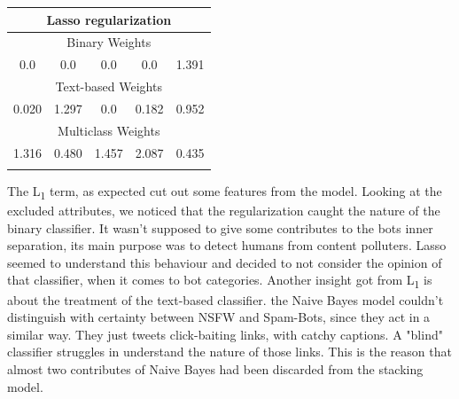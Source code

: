 \begin{center}
	\begin{tabular}{@{}ccccc@{}}
		\multicolumn{5}{c}{\textbf{Lasso regularization}}\\
		\hline\hline
		\multicolumn{5}{c}{Binary Weights}\\
		\hline
		\multicolumn{1}{c|}{0.0}&
		\multicolumn{1}{c|}{0.0}&
		\multicolumn{1}{c|}{0.0}&
		\multicolumn{1}{c|}{0.0}&
		\multicolumn{1}{c}{1.391}\\
		\hline
		\multicolumn{5}{c}{Text-based Weights}\\
		\hline
		\multicolumn{1}{c|}{0.020}&
		\multicolumn{1}{c|}{1.297}&
		\multicolumn{1}{c|}{0.0}&
		\multicolumn{1}{c|}{0.182}&
		\multicolumn{1}{c}{0.952}\\
		\hline
		\multicolumn{5}{c}{Multiclass Weights}\\
		\hline
		\multicolumn{1}{c|}{1.316}&
		\multicolumn{1}{c|}{0.480}&
		\multicolumn{1}{c|}{1.457}&
		\multicolumn{1}{c|}{2.087}&
		\multicolumn{1}{c}{0.435}\\
		\hline\hline\\
	\end{tabular}
\end{center}
The L\textsubscript{1} term, as expected cut out some features from the model.
Looking at the excluded attributes, we noticed that the regularization caught the nature of the binary classifier. It wasn't supposed to give some contributes to the bots inner separation, its main purpose was to detect humans from content polluters.
Lasso seemed to understand this behaviour and decided to not consider the opinion of that classifier, when it comes to bot categories.
Another insight got from L\textsubscript{1} is about the treatment of the text-based classifier. the Naive Bayes model couldn't distinguish with certainty between NSFW and Spam-Bots, since they act in a similar way. They just tweets click-baiting links, with catchy captions. A "blind" classifier struggles in understand the nature of those links. This is the reason that almost two contributes of Naive Bayes had been discarded from the stacking model.


